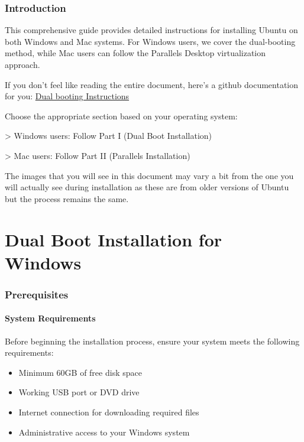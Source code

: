 \documentclass[11pt,a4paper]{article}
\newenvironment{note}
{\begin{tcolorbox}[colback=notecolor!10,colframe=notecolor,title=\textbf{Note}]}
{\end{tcolorbox}}
\begin{document}
\section{Introduction}
This comprehensive guide provides detailed instructions for installing Ubuntu on both Windows and Mac systems. For Windows users, we cover the dual-booting method, while Mac users can follow the Parallels Desktop virtualization approach. 
\begin{tcolorbox}[colback=yellow!10,colframe=orange!50!white,title=\textbf{TL;DR}]
If you don't feel like reading the entire document, here's a github documentation for you: \href{https://github.com/Dikshuy/dual-boot-Mac-Windows/tree/main}{Dual booting Instructions} 
\end{tcolorbox}
\begin{note}
Choose the appropriate section based on your operating system:

> Windows users: Follow Part I (Dual Boot Installation)

> Mac users: Follow Part II (Parallels Installation)
\end{note}

\begin{tcolorbox}[colback=yellow!10,colframe=green!50!white,title=\textbf{Side Note}]
The images that you will see in this document may vary a bit from the one you will actually see during installation as these are from older versions of Ubuntu but the process remains the same.
\end{tcolorbox}


\part{Dual Boot Installation for Windows}

\section{Prerequisites}
\subsection{System Requirements}
Before beginning the installation process, ensure your system meets the following requirements:
\begin{itemize}
    \item Minimum 60GB of free disk space
    \item Working USB port or DVD drive
    \item Internet connection for downloading required files
    \item Administrative access to your Windows system
\end{itemize}
\end{document}
